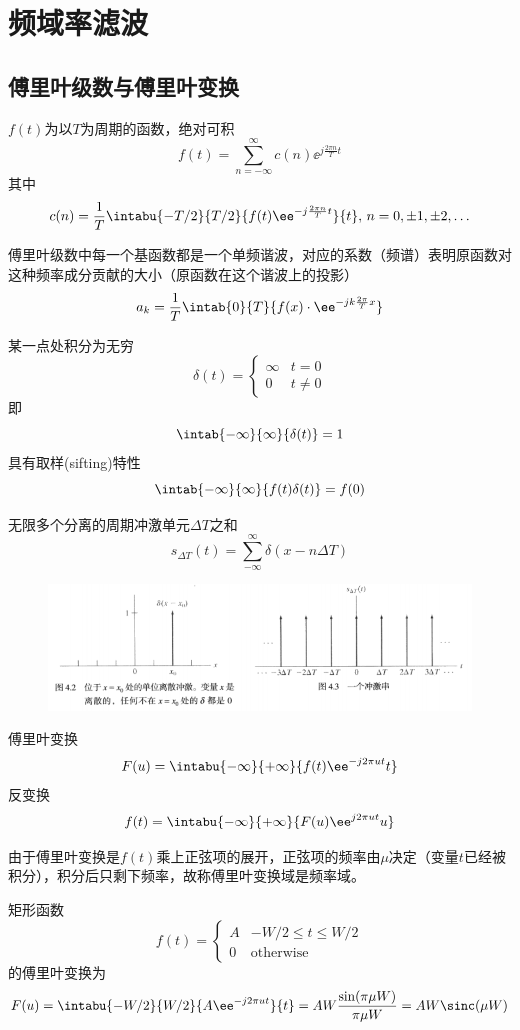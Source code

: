 
\section{频域率滤波}
\subsection{傅里叶级数与傅里叶变换}
\begin{definition}[傅里叶级数]
$f(t)$为以$T$为周期的函数，绝对可积
\[f(t)=\sum_{n=-\infty}^{\infty}c(n)\ee^{j\frac{2\pi n}{T}t}\]
其中
\[c(n)=\frac{1}{T}\intabu{-T/2}{T/2}{f(t)\ee^{-j\frac{2\pi n}{T}t}}{t},\,n=0,\pm 1,\pm 2,\ldots\]
\end{definition}

傅里叶级数中每一个基函数都是一个单频谐波，对应的系数（频谱）表明原函数对这种频率成分贡献的大小（原函数在这个谐波上的投影）
\[a_k=\frac{1}{T}\intab{0}{T}{f(x)\cdot\ee^{-jk\frac{2\pi}{T}x}}\]

\begin{definition}[冲激]
某一点处积分为无穷
\[\delta(t)=\begin{cases}
\infty & t=0\\
0 & t\ne 0
\end{cases}\]
即
\[\intab{-\infty}{\infty}{\delta(t)}=1\]
具有取样(sifting)特性
\[\intab{-\infty}{\infty}{f(t)\delta(t)}=f(0)\]
\end{definition}
\begin{definition}[冲激串]
无限多个分离的周期冲激单元$\Delta T$之和
\[s_{\Delta T}(t)=\sum_{-\infty}^{\infty}\delta(x-n\Delta T)\]
\end{definition}
\begin{figure}[H]
\centering
\includegraphics[width=0.8\linewidth]{fig/impulse.png}
\end{figure}

\begin{definition}[傅里叶变换与反变换]
傅里叶变换
\[F(u)=\intabu{-\infty}{+\infty}{f(t)\ee^{-j 2\pi ut}{t}}\]
反变换
\[f(t)=\intabu{-\infty}{+\infty}{F(u)\ee^{j 2\pi ut}{u}}\]
\end{definition}
由于傅里叶变换是$f(t)$乘上正弦项的展开，正弦项的频率由$\mu$决定（变量$t$已经被积分），积分后只剩下频率，故称傅里叶变换域是频率域。
\begin{example}
矩形函数
\[f(t)=\begin{cases}
A & -W/2\leq t\leq W/2\\
0 & \text{otherwise}
\end{cases}\]
的傅里叶变换为
\[F(u)=\intabu{-W/2}{W/2}{A\ee^{-j2\pi ut}}{t}=AW\frac{\sin(\pi\mu W)}{\pi\mu W}=AW\sinc(\mu W)\]
\end{example}

